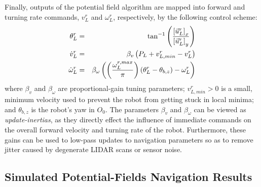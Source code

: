 			Finally, outputs of the potential field algorithm are mapped into forward and turning rate commands, ${v}_{L}^{r}$ and $\omega_{L}^{r}$, respectively, by the following control scheme:
				\begin{eqnarray}
					\theta_{L}^{r} 			&=& \tan^{-1}\left( \frac{ \left[\vec{u}^{r}_{L}\right]_{x} }{ \left[\vec{u}^{r}_{L}\right]_{y} } \right) \nonumber\\
					\dot{v}_{L}^{r} 		&=& \beta_{v} \left( P_{L} + v_{L,min}^{r} - v_{L}^{r} \right) \nonumber \\
					\dot{\omega}_{L}^{r} 	&=& \beta_{\omega} \left( \left( \frac{ \omega_{L}^{r,max} }{\pi} \right) \left(  \theta_{L}^{r} - \theta_{b,z} \right) - \omega_{L}^{r} \right)
				\end{eqnarray}
			where $\beta_{v}$ and $\beta_{\omega}$ are proportional-gain tuning parameters; $v_{L,min}^{r}>0$ is a small, minimum velocity used to prevent the robot from getting stuck in local minima; and $\theta_{b,z}$ is the robot's yaw in $O_{0}$. The parameters $\beta_{v}$ and $\beta_{\omega}$ can be viewed as \emph{update-inertias}, as they directly effect the influence of immediate commands on the overall forward velocity and turning rate of the robot. Furthermore, these gains can be used to low-pass updates to navigation parameters so as to remove jitter caused by degenerate LIDAR scans or sensor noise.


		\subsection{Simulated Potential-Fields Navigation Results}


